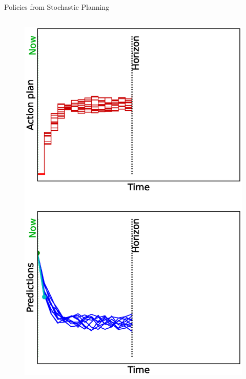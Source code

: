 \documentclass[lecture]{beamer}
\begin{document}
\begin{frame}{\normalsize Policies from Stochastic Planning}
\footnotesize

\begin{columns}


  \begin{overlayarea}{\textwidth}{0.9\textheight}
    \begin{figure}
    \newcommand{\FS}{1}
      \centering
        {%
          \includegraphics[width=\FS\textwidth,clip]{Codes/MPC/MPCMCWRONG0.eps}
        }%
        {%
}
\end{figure}
\end{overlayarea}
\end{columns}
\end{frame}
\end{document}
